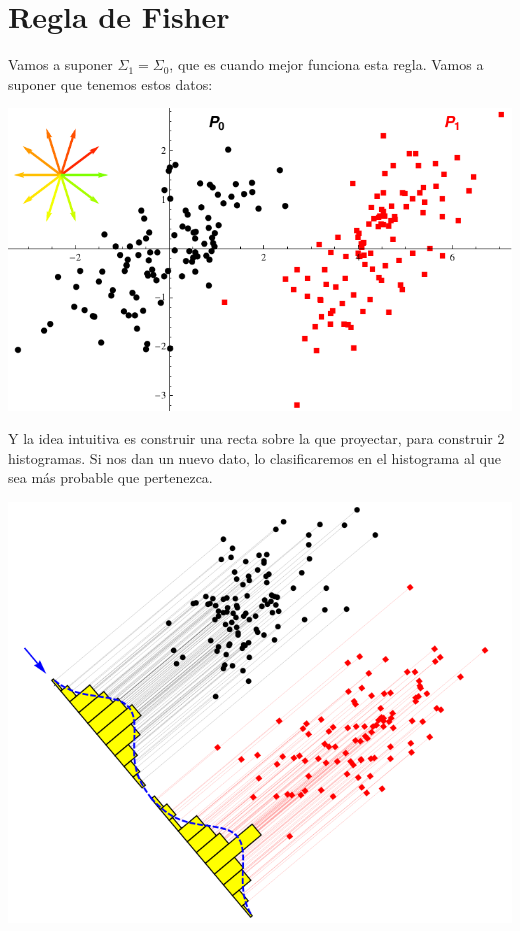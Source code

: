 \section{Regla de Fisher}

Vamos a suponer $Σ_1 = Σ_0$, que es cuando mejor funciona esta regla. Vamos a suponer que tenemos estos datos:

\begin{center}
\includegraphics[width=13 cm]{pdf/tema4/_Fisher}
\end{center}


Y la idea intuitiva es construir una recta sobre la que proyectar, para construir 2 histogramas. Si nos dan un nuevo dato, lo clasificaremos en el histograma al que sea más probable que pertenezca.

\begin{center}
\includegraphics[width=13 cm]{img/ReglaFisherIntuitiva.png}
\end{center}


